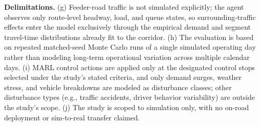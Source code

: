 \textbf{Delimitations.} (g) Feeder-road traffic is not simulated explicitly; the agent observes only route-level headway, load, and queue states, so surrounding-traffic effects enter the model exclusively through the empirical demand and segment travel-time distributions already fit to the corridor. (h) The evaluation is based on repeated matched-seed Monte Carlo runs of a single simulated operating day rather than modeling long-term operational variation across multiple calendar days. (i) MARL control actions are applied only at the designated control stops selected under the study's stated criteria, and only demand surges, weather stress, and vehicle breakdowns are modeled as disturbance classes; other disturbance types (e.g., traffic accidents, driver behavior variability) are outside the study's scope. (j) The study is scoped to simulation only, with no on-road deployment or sim-to-real transfer claimed.